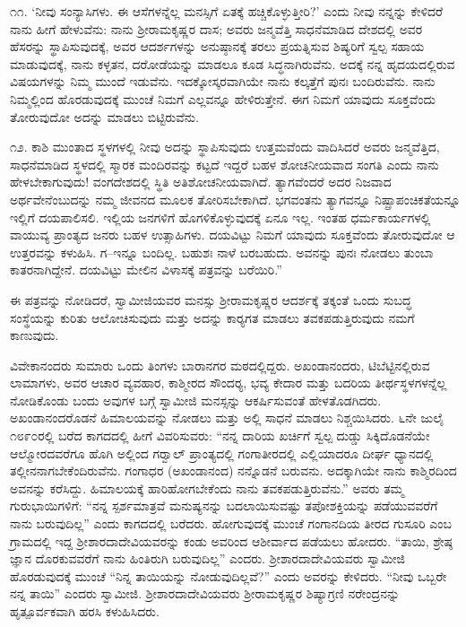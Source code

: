  ೧೧. ‘ನೀವು ಸಂನ್ಯಾಸಿಗಳು. ಈ ಆಸೆಗಳನ್ನೆಲ್ಲ ಮನಸ್ಸಿಗೆ ಏತಕ್ಕೆ ಹಚ್ಚಿಕೊಳ್ಳುತ್ತೀರಿ?’ ಎಂದು ನೀವು ನನ್ನನ್ನು ಕೇಳಿದರೆ ನಾನು ಹೀಗೆ ಹೇಳುವೆನು: ನಾನು ಶ‍್ರೀರಾಮಕೃಷ್ಣರ ದಾಸ; ಅವರು ಜನ್ಮವೆತ್ತಿ ಸಾಧನೆಮಾಡಿದ ದೇಶದಲ್ಲಿ ಅವರ ಹೆಸರನ್ನು ಸ್ಥಾಪಿಸುವುದಕ್ಕೆ, ಅವರ ಆದರ್ಶಗಳನ್ನು ಅನುಷ್ಠಾನಕ್ಕೆ ತರಲು ಪ್ರಯತ್ನಿಸುವ ಶಿಷ್ಯರಿಗೆ ಸ್ವಲ್ಪ ಸಹಾಯ ಮಾಡುವುದಕ್ಕೆ, ನಾನು ಕಳ್ಳತನ, ದರೋಡೆಯನ್ನು ಮಾಡಲೂ ಕೂಡ ಸಿದ್ಧನಾಗಿರುವೆನು. ಅದಕ್ಕೆ ನನ್ನ ಹೃದಯದಲ್ಲಿರುವ ವಿಷಯಗಳನ್ನು ನಿಮ್ಮ ಮುಂದೆ ಇಡುವೆನು. ಇದಕ್ಕೋಸ್ಕರವಾಗಿಯೇ ನಾನು ಕಲ್ಕತ್ತೆಗೆ ಪುನಃ ಬಂದಿರುವೆನು. ನಾನು ನಿಮ್ಮಲ್ಲಿಂದ ಹೊರಡುವುದಕ್ಕೆ ಮುಂಚೆ ನಿಮಗೆ ಎಲ್ಲವನ್ನೂ ಹೇಳಿರುತ್ತೇನೆ. ಈಗ ನಿಮಗೆ ಯಾವುದು ಸೂಕ್ತವೆಂದು ತೋರುವುದೋ ಅದನ್ನು ಮಾಡಲು ಬಿಟ್ಟಿರುವೆನು. 

 ೧೨. ಕಾಶಿ ಮುಂತಾದ ಸ್ಥಳಗಳಲ್ಲಿ ನೀವು ಅದನ್ನು ಸ್ಥಾಪಿಸುವುದು ಉತ್ತಮವೆಂದು ವಾದಿಸಿದರೆ ಅವರು ಜನ್ಮವೆತ್ತಿದ, ಸಾಧನೆಮಾಡಿದ ಸ್ಥಳದಲ್ಲಿ ಸ್ಮಾರಕ ಮಂದಿರವನ್ನು ಕಟ್ಟದೆ ಇದ್ದರೆ ಬಹಳ ಶೋಚನೀಯವಾದ ಸಂಗತಿ ಎಂದು ನಾನು ಹೇಳಬೇಕಾಗುವುದು! ವಂಗದೇಶದಲ್ಲಿ ಸ್ಥಿತಿ ಅತಿಶೋಚನೀಯವಾಗಿದೆ. ತ್ಯಾಗವೆಂದರೆ ಅದರ ನಿಜವಾದ ಅರ್ಥವೇನೆಂಬುದನ್ನು ನಮ್ಮ ಜೀವನದ ಮೂಲಕ ತೋರಿಸಬೇಕಾಗಿದೆ. ಭಗವಂತನು ತ್ಯಾಗವನ್ನೂ ನಿಷ್ಪ್ರಾಪಂಚಿಕತೆಯನ್ನೂ ಇಲ್ಲಿಗೆ ದಯಪಾಲಿಸಲಿ. ಇಲ್ಲಿಯ ಜನಗಳಿಗೆ ಹೊಗಳಿಕೊಳ್ಳುವುದಕ್ಕೆ ಏನೂ ಇಲ್ಲ. ಇಂತಹ ಧರ್ಮಕಾರ್ಯಗಳಲ್ಲಿ ವಾಯುವ್ಯ ಪ್ರಾಂತ್ಯದ ಜನರು ಬಹಳ ಉತ್ಸಾಹಿಗಳು. ದಯವಿಟ್ಟು ನಿಮಗೆ ಯಾವುದು ಸೂಕ್ತವೆಂದು ತೋರುವುದೋ ಆ ಉತ್ತರವನ್ನು ಕಳುಹಿಸಿ. ಗ–ಇನ್ನೂ ಬಂದಿಲ್ಲ. ಬಹುಶಃ ನಾಳೆ ಬರಬಹುದು. ಅವನನ್ನು ಪುನಃ ನೋಡಲು ತುಂಬಾ ಕಾತರನಾಗಿದ್ದೇನೆ. ದಯವಿಟ್ಟು ಮೇಲಿನ ವಿಳಾಸಕ್ಕೆ ಪತ್ರವನ್ನು ಬರೆಯಿರಿ.” 

 ಈ ಪತ್ರವನ್ನು ನೋಡಿದರೆ, ಸ್ವಾಮೀಜಿಯವರ ಮನಸ್ಸು ಶ‍್ರೀರಾಮಕೃಷ್ಣರ ಆದರ್ಶಕ್ಕೆ ತಕ್ಕಂತೆ ಒಂದು ಸುಬದ್ಧ ಸಂಸ್ಥೆಯನ್ನು ಕುರಿತು ಆಲೋಚಿಸುವುದು ಮತ್ತು ಅದನ್ನು ಕಾರ‍್ಯಗತ ಮಾಡಲು ತವಕಪಡುತ್ತಿರುವುದು ನಮಗೆ ಕಾಣುವುದು. 

 ವಿವೇಕಾನಂದರು ಸುಮಾರು ಒಂದು ತಿಂಗಳು ಬಾರಾನಗರ ಮಠದಲ್ಲಿದ್ದರು. ಅಖಂಡಾನಂದರು, ಟಿಬೆಟ್ಟಿನಲ್ಲಿರುವ ಲಾಮಾಗಳು, ಅವರ ಆಚಾರ ವ್ಯವಹಾರ, ಕಾಶ್ಮೀರದ ಸೌಂದರ‍್ಯ, ಭವ್ಯ ಕೇದಾರ ಮತ್ತು ಬದರಿಯ ತೀರ್ಥಸ್ಥಳಗಳನ್ನೆಲ್ಲ ನೋಡಿಕೊಂಡು ಬಂದು ಅವುಗಳ ಬಗ್ಗೆ ಸ್ವಾಮೀಜಿ ಮನಸ್ಸನ್ನು ಆಕರ್ಷಿಸುವಂತೆ ಹೇಳತೊಡಗಿದರು. ಅಖಂಡಾನಂದರೊಡನೆ ಹಿಮಾಲಯವನ್ನು ನೋಡಲು ಮತ್ತು ಅಲ್ಲಿ ಸಾಧನೆ ಮಾಡಲು ನಿಶ್ಚಯಿಸಿದರು. ೬ನೇ ಜುಲೈ ೧೮೯೦ರಲ್ಲಿ ಬರೆದ ಕಾಗದದಲ್ಲಿ ಹೀಗೆ ವಿವರಿಸುವರು: “ನನ್ನ ದಾರಿಯ ಖರ್ಚಿಗೆ ಸ್ವಲ್ಪ ದುಡ್ಡು ಸಿಕ್ಕಿದೊಡನೆಯೇ ಆಲ್ಮೋರದವರೆಗೂ ಹೊಗಿ ಅಲ್ಲಿಂದ ಗರ‍್ವಾಲ್ ಪ್ರಾಂತ್ಯದಲ್ಲಿ ಗಂಗಾತೀರದಲ್ಲಿ ಎಲ್ಲಿಯಾದರೂ ದೀರ್ಘ ಧ್ಯಾನದಲ್ಲಿ ತಲ್ಲೀನನಾಗಬೇಕೆಂದಿರುವೆನು. ಗಂಗಾಧರ (ಅಖಂಡಾನಂದ) ನನ್ನೊಡನೆ ಬರುವನು. ಅದಕ್ಕಾಗಿಯೇ ನಾನು ಕಾಶ್ಮಿರದಿಂದ ಅವನನ್ನು ಕರೆಸಿದ್ದು. ಹಿಮಾಲಯಕ್ಕೆ ಹಾರಿಹೋಗಬೇಕೆಂದು ನಾನು ತವಕಪಡುತ್ತಿರುವೆನು.” ಅವರು ತಮ್ಮ ಗುರುಭಾಯಿಗಳಿಗೆ: “ನನ್ನ ಸ್ಪರ್ಶಮಾತ್ರವೆ ಮನುಷ್ಯನನ್ನು ಬದಲಾಯಿಸುವಷ್ಟು ತಪೋಶಕ್ತಿಯನ್ನು ಪಡೆಯುವವರೆಗೆ ನಾನು ಬರುವುದಿಲ್ಲ” ಎಂದು ಕಾಗದದಲ್ಲಿ ಬರೆದರು. ಹೋಗುವುದಕ್ಕೆ ಮುಂಚೆ ಗಂಗಾನದಿಯ ತೀರದ ಗುಸೂರಿ ಎಂಬ ಗ್ರಾಮದಲ್ಲಿ ಇದ್ದ ಶ‍್ರೀಶಾರದಾದೇವಿಯವರನ್ನು ಕಂಡು ಅವರಿಂದ ಆಶೀರ್ವಾದ ಪಡೆಯಲು ಹೋದರು. “ತಾಯಿ, ಶ್ರೇಷ್ಠ ಜ್ಞಾನ ದೊರಕುವವರೆಗೆ ನಾನು ಹಿಂತಿರುಗಿ ಬರುವುದಿಲ್ಲ” ಎಂದರು. ಶ‍್ರೀಶಾರದಾದೇವಿ\-ಯವರು ಸ್ವಾಮೀಜಿ ಹೊರಡುವುದಕ್ಕೆ ಮುಂಚೆ “ನಿನ್ನ ತಾಯಿಯನ್ನು ನೋಡುವುದಿಲ್ಲವೆ?” ಎಂದು ಅವರನ್ನು ಕೇಳಿದರು. “ನೀವು ಒಬ್ಬರೇ ನನ್ನ ತಾಯಿ” ಎಂದರು ಸ್ವಾಮೀಜಿ. ಶ‍್ರೀಶಾರದಾದೇವಿಯವರು ಶ‍್ರೀರಾಮಕೃಷ್ಣರ ಶಿಷ್ಯಾಗ್ರಣಿ ನರೇಂದ್ರನನ್ನು ಹೃತ್ಪೂರ್ವಕವಾಗಿ ಹರಸಿ ಕಳುಹಿಸಿದರು.

